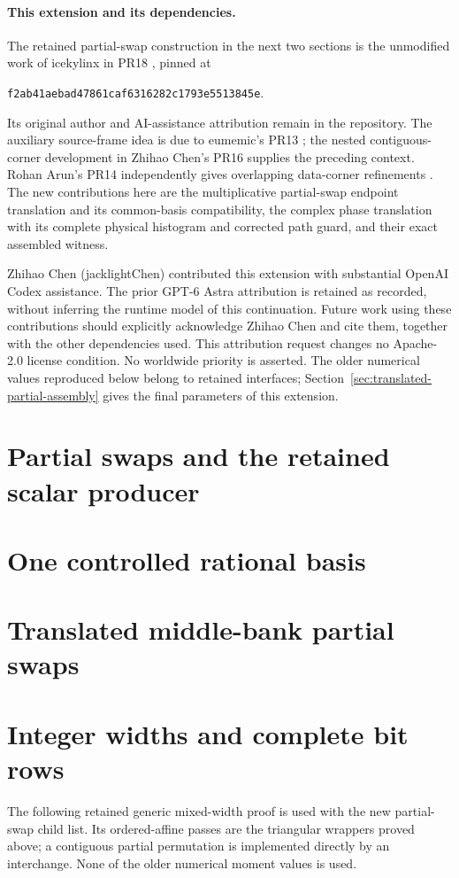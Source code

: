 \documentclass[11pt]{article}
\begin{document}
\paragraph{This extension and its dependencies.}
The retained partial-swap construction in the next two sections is the
unmodified work of icekylinx in PR18 \cite{pr18}, pinned at
\par\noindent\texttt{f2ab41aebad47861caf6316282c1793e5513845e}.
\par\noindent Its original author
and AI-assistance attribution remain in the repository. The auxiliary
source-frame idea is due to eumemic's PR13 \cite{pr13}; the nested
contiguous-corner development in Zhihao Chen's PR16 \cite{pr16} supplies
the preceding context. Rohan Arun's PR14 independently gives overlapping
data-corner refinements \cite{pr14}. The new contributions here are the
multiplicative partial-swap endpoint translation and its common-basis
compatibility, the complex phase translation with its complete physical
histogram and corrected path guard, and their exact assembled witness.

Zhihao Chen (jacklightChen) contributed this extension with substantial
OpenAI Codex assistance. The prior GPT-6 Astra attribution is retained as
recorded, without inferring the runtime model of this continuation. Future
work using these contributions should explicitly acknowledge Zhihao Chen
and cite them, together with the other dependencies used. This attribution
request changes no Apache-2.0 license condition. No worldwide priority is
asserted. The older numerical values reproduced below belong to retained
interfaces; Section~\ref{sec:translated-partial-assembly} gives the final
parameters of this extension.

\section{Partial swaps and the retained scalar producer}
{\small}
\section{One controlled rational basis}

\section{Translated middle-bank partial swaps}

\section{Integer widths and complete bit rows}
The following retained generic mixed-width proof is used with the new
partial-swap child list. Its ordered-affine passes are the triangular
wrappers proved above; a contiguous partial permutation is implemented
directly by an interchange. None of the older numerical moment values is
used.

\end{document}
